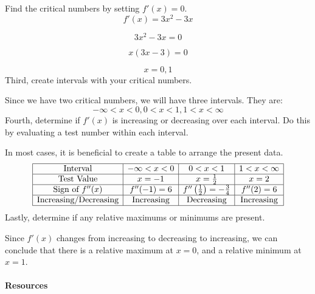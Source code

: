 Find the critical numbers by setting $f'(x) = 0$.
$$
f'(x) = 3x^2 - 3x
$$



$$
3x^2 - 3x = 0
$$



$$
x(3x - 3) = 0
$$



$$
x = 0,1
$$
Third, create intervals with your critical numbers.



Since we have two critical numbers, we will have three intervals. They are:
$$
-\infty < x < 0, 0 < x < 1, 1 < x < \infty
$$
Fourth, determine if $f'(x)$ is increasing or decreasing over each interval. Do this by evaluating a test number within each interval.



In most cases, it is beneficial to create a table to arrange the present data.
$$
\begin{array}{|c|c|c|c|}
\hline
\text{Interval} & -\infty < x < 0 & 0 < x < 1 & 1 < x < \infty \\
\hline
\text{Test Value} & x = -1 & x = \frac{1}{2} & x = 2 \\ \hline

\text{Sign of } f''(x) & f''(-1) = 6 & f''\left(\frac{1}{2}\right) = -\frac{3}{4} & f''(2) = 6 \\ \hline

\text{Increasing/Decreasing} & \text{Increasing} & \text{Decreasing} & \text{Increasing} \\ \hline

\end{array}
$$
Lastly, determine if any relative maximums or minimums are present.



Since $f'(x)$ changes from increasing to decreasing to increasing, we can conclude that there is a relative maximum at $x = 0$, and a relative minimum at $x = 1$.



\paragraph{Resources}



